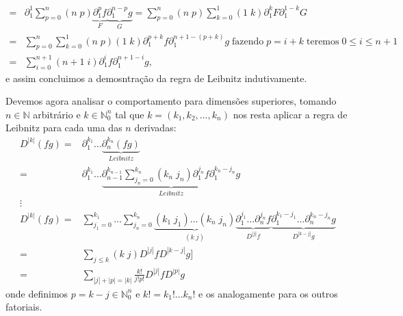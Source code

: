 \documentclass{article}
\begin{document}
\begin{enumerate}
$$\begin{aligned}
		= & \partial^{1}_{1} \sum_{p=0}^{n} (n \; p) \underbrace{\partial^{p}_{1} f}_{F}  \underbrace{\partial^{n-p}_{1} g}_{G} = \sum_{p=0}^{n} (n \; p) \sum_{k=0}^{1} (1 \; k)\partial^{k}_{1} F  \partial^{1-k}_{1} G \\
		= & \sum_{p=0}^{n} \sum_{k=0}^{1} (n \; p) (1 \; k)\partial^{p+k}_{1} f  \partial^{n+1-(p+k)}_{1} g \; \text{fazendo} \; p = i+k \; \text{teremos} \; 0 \leq i \leq n+1 \\
		= & \sum_{i=0}^{n+1} (n+1 \; i) \partial^{i}_{1} f  \partial^{n+1-i}_{1} g,
		\end{aligned}
		$$
		e assim concluimos a demosntração da regra de Leibnitz indutivamente.
		
		Devemos agora analisar o comportamento para dimensões superiores, tomando $n \in \mathbb{N}$ arbitrário e $k \in \mathbb{N}^{n}_{0}$ tal que $k = (k_{1}, k_{2}, \dots, k_{n})$ nos resta aplicar a regra de Leibnitz para cada uma das $n$ derivadas:
		$$
		\begin{aligned}
		D^{|k|} (fg) 
		= & \partial^{k_1}_{1} \dots \underbrace{\partial^{k_n}_{n}(fg)}_{Leibnitz} \\
		= & \partial^{k_1}_{1} \dots \underbrace{ \partial^{k_{n-1}}_{n-1} \sum_{j_{n}=0}^{k_{n}} (k_{n} \; j_{n}) \partial^{j_{n}}_{1} f  \partial^{k_{n}-j_{n}}_{1} g }_{Leibnitz}\\
		\vdots & \\
		D^{|k|} (fg) 
		= & \sum_{j_{1}=0}^{k_{1}} \dots \sum_{j_{n}=0}^{k_{n}} \underbrace{ (k_{1} \; j_{1}) \dots (k_{n} \; j_{n}) }_{(k \; j)} \underbrace{ \partial_{1}^{j_{1}} \dots \partial_{n}^{j_{n}}f }_{D^{|j|}f} \underbrace{ \partial_{1}^{k_{1}-j_{1}} \dots \partial_{n}^{k_{n}-j_{n}}g }_{D^{|k-j|}g} \\
		= & \sum_{j \leq k} (k \; j) D^{|j|}f D^{|k-j|}g] \\
		= & \sum_{|j| + |p| = |k|} \frac{k!}{j!p!} D^{|j|}f D^{|p|}g
		\end{aligned}
		$$
		onde definimos $p = k-j \in \mathbb{N}^{n}_{0}$ e $k! = k_{1}!...k_{n}!$ e os analogamente para os outros fatoriais.
	\end{enumerate}
	
	
\end{document}
